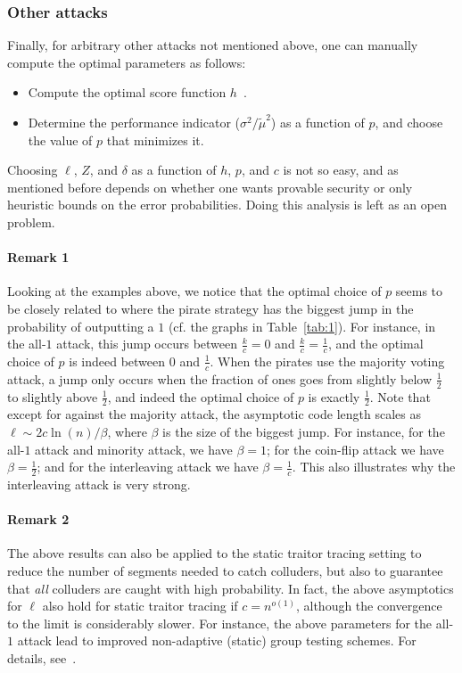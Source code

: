 \documentclass[10pt,a4paper,twocolumn]{article}
\begin{document}
\subsubsection*{Other attacks}
Finally, for arbitrary other attacks not mentioned above, one can manually compute the optimal parameters as follows:
\begin{itemize}
	\item Compute the optimal score function $h$~\cite[Cor.~7~and~8]{oosterwijk13}.
	\item Determine the performance indicator ($\sigma^2/\tilde{\mu}^2$) as a function of $p$, and choose the value of $p$ that minimizes it.
\end{itemize}
Choosing $\ell$, $Z$, and $\delta$ as a function of $h$, $p$, and $c$ is not so easy, and as mentioned before depends on whether one wants provable security or only heuristic bounds on the error probabilities. Doing this analysis is left as an open problem.

\paragraph*{Remark 1} Looking at the examples above, we notice that the optimal choice of $p$ seems to be closely related to where the pirate strategy has the biggest jump in the probability of outputting a $1$ (cf. the graphs in Table~\ref{tab:1}). For instance, in the all-$1$ attack, this jump occurs between $\frac{k}{c} = 0$ and $\frac{k}{c} = \frac{1}{c}$, and the optimal choice of $p$ is indeed between $0$ and $\frac{1}{c}$. When the pirates use the majority voting attack, a jump only occurs when the fraction of ones goes from slightly below $\frac{1}{2}$ to slightly above $\frac{1}{2}$, and indeed the optimal choice of $p$ is exactly $\frac{1}{2}$. Note that except for against the majority attack, the asymptotic code length scales as $\ell \sim 2 c \ln (n) / \beta$, where $\beta$ is the size of the biggest jump. For instance, for the all-$1$ attack and minority attack, we have $\beta = 1$; for the coin-flip attack we have $\beta = \frac{1}{2}$; and for the interleaving attack we have $\beta = \frac{1}{c}$. This also illustrates why the interleaving attack is very strong.

\paragraph*{Remark 2} The above results can also be applied to the static traitor tracing setting to reduce the number of segments needed to catch colluders, but also to guarantee that \textit{all} colluders are caught with high probability. In fact, the above asymptotics for $\ell$ also hold for static traitor tracing if $c = n^{o(1)}$, although the convergence to the limit is considerably slower. For instance, the above parameters for the all-$1$ attack lead to improved non-adaptive (static) group testing schemes. For details, see~\cite{laarhoven13allerton}.
\end{document}
